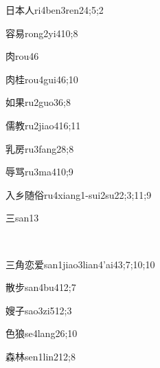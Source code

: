 \begin{verbete}{日本人}{ri4ben3ren2}{4;5;2}
\end{verbete}
\begin{verbete}{容易}{rong2yi4}{10;8}
\end{verbete}
\begin{verbete}{肉}{rou4}{6}
\end{verbete}
\begin{verbete}{肉桂}{rou4gui4}{6;10}
\end{verbete}
\begin{verbete}{如果}{ru2guo3}{6;8}
\end{verbete}
\begin{verbete}{儒教}{ru2jiao4}{16;11}
\end{verbete}
\begin{verbete}{乳房}{ru3fang2}{8;8}
\end{verbete}
\begin{verbete}{辱骂}{ru3ma4}{10;9}
\end{verbete}
\begin{verbete}{入乡随俗}{ru4xiang1-sui2su2}{2;3;11;9}
\end{verbete}
\begin{verbete}{三}{san1}{3}
\end{verbete}
﻿\begin{verbete}{三角恋爱}{san1jiao3lian4'ai4}{3;7;10;10}
\end{verbete}
\begin{verbete}{散步}{san4bu4}{12;7}
\end{verbete}
\begin{verbete}{嫂子}{sao3zi5}{12;3}
\end{verbete}
\begin{verbete}{色狼}{se4lang2}{6;10}
\end{verbete}
\begin{verbete}{森林}{sen1lin2}{12;8}
\end{verbete}
